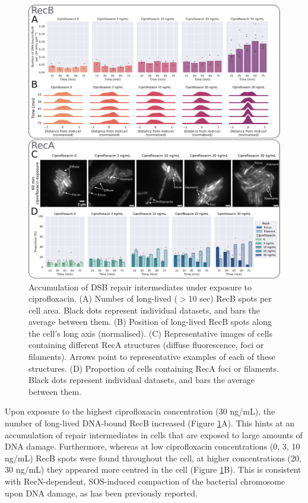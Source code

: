 \begin{figure}[htbp]
    \centering
    \includegraphics[width=\textwidth]{Figures/Fig4_cipro_30ngmL.pdf}
    \caption{Accumulation of DSB repair intermediates under exposure to ciprofloxacin. (A) Number of long-lived ($>$10 sec) RecB spots per cell area. Black dots represent individual datasets, and bars the average between them. (B) Position of long-lived RecB spots along the cell's long axis (normalised). (C) Representative images of cells containing different RecA structures (diffuse fluorescence, foci or filaments). Arrows point to representative examples of each of these structures. (D) Proportion of cells containing RecA foci or filaments. Black dots represent individual datasets, and bars the average between them.}
    \label{Fig:high_cipro}
\end{figure}

Upon exposure to the highest cipro\-floxacin concentration (30 ng/mL), the number of long-lived DNA-bound RecB increased (Figure \ref{Fig:high_cipro}A). This hints at an accumulation of repair intermediates in cells that are exposed to large amounts of DNA damage. Furthermore, whereas at low ciprofloxacin concentrations (0, 3, 10 ng/mL) RecB spots were found throughout the cell, at higher concentrations (20, 30 ng/mL) they appeared more centred in the cell (Figure \ref{Fig:high_cipro}B). This is consistent with RecN-dependent, SOS-induced compaction of the bacterial chromosome upon DNA damage, as has been previously reported\cite{Odsbu2014}.

